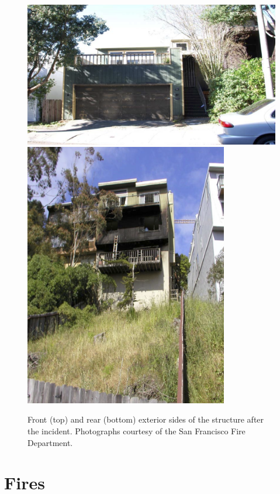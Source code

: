 \documentclass[12pt,oneside]{book}
\begin{document}
\begin{figure}[!ht]
\includegraphics[width=5.50in]{../Figures/Post_Exterior_Front} \\
\vspace{0.1in}
\includegraphics[width=3.50in]{../Figures/Post_Exterior_Rear}
\caption[Front and rear exterior of the structure after the incident.]
{Front (top) and rear (bottom) exterior sides of the structure after the incident. Photographs courtesy of the San Francisco Fire Department.}
\label{fig:post_exterior}
\end{figure}

\section{Fires}
\label{sec:fires}
\end{document}
